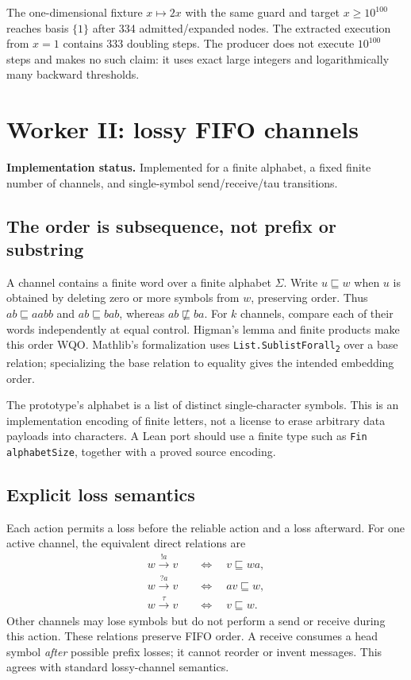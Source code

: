 \documentclass[11pt,a4paper]{article}
\theoremstyle{definition}
\newcommand{\code}[1]{\texttt{#1}}
\newcommand{\status}[1]{\noindent\textbf{Implementation status.} #1\par}
\begin{document}
The one-dimensional fixture $x\mapsto2x$ with the same guard and target
$x\geq10^{100}$ reaches basis $\{1\}$ after 334 admitted/expanded nodes.
The extracted execution from $x=1$ contains 333 doubling steps. The producer
does not execute $10^{100}$ steps and makes no such claim: it uses exact
large integers and logarithmically many backward thresholds.

\section{Worker II: lossy FIFO channels}
\label{sec:fifo}
\status{Implemented for a finite alphabet, a fixed finite number of channels, and single-symbol send/receive/tau transitions.}

\subsection{The order is subsequence, not prefix or substring}
A channel contains a finite word over a finite alphabet $\Sigma$. Write
$u\sqsubseteq w$ when $u$ is obtained by deleting zero or more symbols from
$w$, preserving order. Thus $ab\sqsubseteq aabb$ and
$ab\sqsubseteq bab$, whereas $ab\not\sqsubseteq ba$.
For $k$ channels, compare each of their words independently at equal control.
Higman's lemma and finite products make this order WQO. Mathlib's
formalization uses \code{List.SublistForall\textsubscript{2}} over a base
relation; specializing the base relation to equality gives the intended
embedding order.\cite{mathlibwqo}

The prototype's alphabet is a list of distinct single-character symbols.
This is an implementation encoding of finite letters, not a license to erase
arbitrary data payloads into characters. A Lean port should use a finite type
such as \code{Fin alphabetSize}, together with a proved source encoding.

\subsection{Explicit loss semantics}
Each action permits a loss before the reliable action and a loss afterward.
For one active channel, the equivalent direct relations are
\begin{align}
 w\xrightarrow{!a}v&\quad\Longleftrightarrow\quad v\sqsubseteq wa,\\
 w\xrightarrow{?a}v&\quad\Longleftrightarrow\quad av\sqsubseteq w,\\
 w\xrightarrow{\tau}v&\quad\Longleftrightarrow\quad v\sqsubseteq w.
 \label{eq:losssem}
\end{align}
Other channels may lose symbols but do not perform a send or receive during
this action. These relations preserve FIFO order. A receive consumes a head
symbol \emph{after} possible prefix losses; it cannot reorder or invent
messages. This agrees with standard lossy-channel semantics.\cite{flat}
\end{document}

